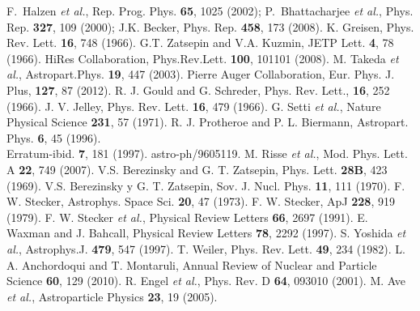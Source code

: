 \begin{thebibliography}{1}
F.~Halzen {\it et al.}, Rep. Prog. Phys. {\bf 65}, 1025 (2002);\newline
P.~Bhattacharjee {\it et al.}, Phys. Rep. {\bf 327}, 109 (2000);\newline
J.K. Becker, Phys. Rep. {\bf 458}, 173 (2008). 
 K. Greisen, Phys. Rev. Lett. \textbf{16}, 748 (1966).
 G.T. Zatsepin and V.A. Kuzmin, JETP Lett. \textbf{4}, 78 (1966).
 HiRes Collaboration, Phys.Rev.Lett. \textbf{100}, 101101 (2008).
  M. Takeda {\it et al.}, Astropart.Phys. \textbf{19}, 447 (2003).
 Pierre Auger Collaboration, Eur. Phys. J. Plus, \textbf{127}, 87 (2012).
 R. J. Gould and G. Schreder, Phys. Rev. Lett., \textbf{16}, 252 (1966).
  J. V. Jelley, Phys. Rev. Lett. \textbf{16}, 479 (1966).
 G. Setti {\it et al.}, Nature Physical Science \textbf{231}, 57 (1971).
 R. J. Protheroe and P. L. Biermann, Astropart. Phys. \textbf{6}, 45 (1996).\\
Erratum-ibid. \textbf{7}, 181 (1997). astro-ph/9605119.
 M. Risse {\it et al.}, Mod. Phys. Lett. A \textbf{22}, 749 (2007).
 V.S. Berezinsky and G. T. Zatsepin, Phys. Lett. {\bf 28B}, 423 (1969).\newline
V.S. Berezinsky y G. T. Zatsepin, Sov. J. Nucl. Phys. {\bf 11}, 111 (1970).
 F. W. Stecker, Astrophys. Space Sci. {\bf 20}, 47 (1973).\newline
F. W. Stecker, ApJ {\bf 228}, 919 (1979).
 F. W. Stecker  {\it et al.}, Physical Review Letters \textbf{66}, 2697 (1991).
 E. Waxman and J. Bahcall,  Physical Review Letters \textbf{78}, 2292 (1997).
 S. Yoshida {\it et al.}, Astrophys.J. \textbf{479}, 547 (1997).
 T. Weiler,  Phys. Rev. Lett. \textbf{49}, 234 (1982).
 L. A. Anchordoqui and T. Montaruli, Annual Review of Nuclear and Particle Science \textbf{60}, 129 (2010).
 R. Engel {\it et al.}, Phys. Rev. D \textbf{64}, 093010 (2001).
 M. Ave {\it et al.}, Astroparticle Physics \textbf{23}, 19 (2005).

\end{thebibliography}
